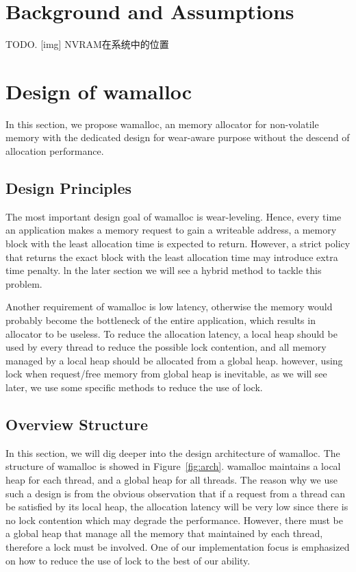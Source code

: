\documentclass{vldb}
\begin{document}
\section{Background and Assumptions}

TODO.
[img] NVRAM在系统中的位置

\section{Design of wamalloc}

In this section, we propose wamalloc, an memory allocator for non-volatile memory with the dedicated design for wear-aware purpose without the descend of allocation performance.

\subsection{Design Principles}

The most important design goal of wamalloc is wear-leveling. 
Hence, every time an application makes a memory request to gain a writeable address, 
a memory block with the least allocation time is expected to return.
However, a strict policy that returns the exact block with the least allocation time may introduce extra time penalty.
ln the later section we will see a hybrid method to tackle this problem.

Another requirement of wamalloc is low latency,
otherwise the memory would probably become the bottleneck of the entire application,
which results in allocator to be useless. 
To reduce the allocation latency, a local heap should be used by every thread to reduce the possible lock contention,
and all memory managed by a local heap should be allocated from a global heap.
however, using lock when request/free memory from global heap is inevitable,
as we will see later, we use some specific methods to reduce the use of lock.

\subsection{Overview Structure}

In this section, we will dig deeper into the design architecture of wamalloc.
The structure of wamalloc is showed in Figure~\ref{fig:arch}.
wamalloc maintains a local heap for each thread, and a global heap for all threads.
The reason why we use such a design is from the obvious observation that if a request from a thread can be satisfied by its local heap,
the allocation latency will be very low since there is no lock contention which may degrade the performance.
However, there must be a global heap that manage all the memory that maintained by each thread,
therefore a lock must be involved. One of our implementation focus is emphasized on how to reduce the use of lock to the best of our ability.
\end{document}
